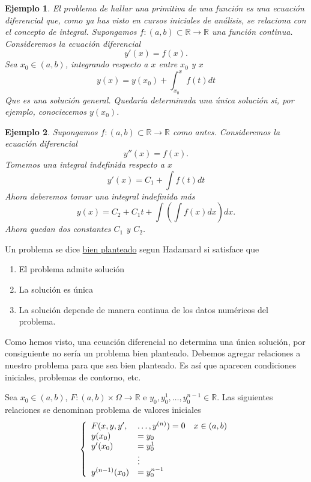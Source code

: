 \documentclass{article}
\newcommand{\rr}{\mathbb{R}}
\newtheorem{ejemplo}{Ejemplo}}
\begin{document}
\begin{ejemplo} El problema de hallar una primitiva de una función es una ecuación diferencial que, como ya has visto en cursos iniciales de análisis, se relaciona con el concepto de integral. Supongamos $f:(a,b)\subset \rr\to\rr$ una función continua. Consideremos la ecuación diferencial
\[y'(x)=f(x).\]
Sea $x_0\in(a,b)$, integrando respecto a $x$ entre $x_0$ y $x$
\[y(x)=y(x_0)+\int_{x_0}^xf(t)dt\]
Que es una solución general. Quedaría determinada una única solución si, por ejemplo, conociecemos $y(x_0)$.
\end{ejemplo}



\begin{ejemplo} Supongamos $f:(a,b)\subset \rr\to\rr$ como antes. Consideremos la ecuación diferencial
\[y''(x)=f(x).\]
Tomemos una integral indefinida respecto a $x$ 
\[y'(x)=C_1+\int f(t)dt\]
Ahora deberemos tomar una integral indefinida más
\[y(x)=C_2+C_1t +\int\left(\int f(x)dx\right)dx.\]
Ahora quedan dos constantes $C_1$ y $C_2$. 
\end{ejemplo}



 \begin{definicion}
 Un problema se dice \href{http://es.wikipedia.org/wiki/Problema_bien_definido}{bien planteado} segun Hadamard si satisface que
 \begin{enumerate}
  \item El problema admite solución
  \item La solución es única
  \item La solución depende de manera continua de los datos numéricos del problema.
 \end{enumerate}
\end{definicion}

 Como hemos visto, una ecuación diferencial no determina una única solución, por consiguiente no sería un problema bien planteado. Debemos agregar relaciones
a nuestro problema para que sea bien planteado. Es así que aparecen condiciones iniciales, problemas de contorno, etc.
 




\begin{definicion} Sea $x_0\in(a,b)$, $F:(a,b)\times \Omega\to\rr$ e $y_0,y_0^1,\ldots,y_0^{n-1}\in\rr$. Las siguientes relaciones  se denominan problema de
valores iniciales
\[
 \left\{\begin{array}{l l l}
         F(x,y,y',&\ldots,y^{(n)})=0& x\in(a,b)\\
         y(x_0)&=y_0&\\
         y'(x_0)&=y_0^1&\\
          & \vdots &\\
          y^{(n-1)}(x_0)&=y_0^{n-1}&\\
        \end{array}
   \right.
\]

\end{definicion}
\end{document}
